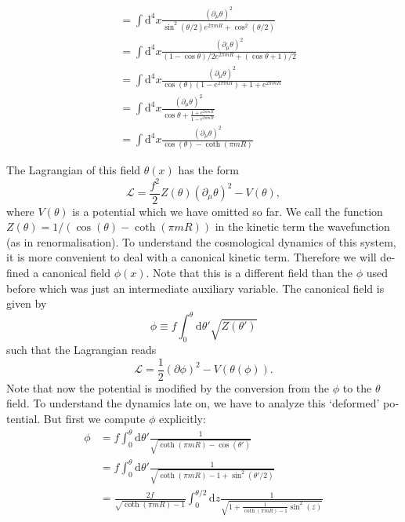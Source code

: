 \documentclass[master,       %
               twoside,        %
               BCOR10mm,       %
               english,ngerman, %
               ]{GAUBM}
\begin{document}
\begin{otherlanguage}{english}
\begin{align}
	 &= \int \mathrm{d}^4 x \frac{(\partial_\mu \theta)^2}{\sin^2(\theta / 2) e^{2\pi m R} + \cos^2(\theta / 2)} \nonumber \\
	 &= \int \mathrm{d}^4 x \frac{(\partial_\mu \theta)^2}{(1 - \cos \theta) / 2 e^{2\pi m R} + (\cos \theta + 1) / 2} \nonumber \\
	 &= \int \mathrm{d}^4 x \frac{(\partial_\mu \theta)^2}{\cos(\theta)(1 - e^{2\pi mR}) + 1 + e^{2\pi mR}} \nonumber \\
	 &= \int \mathrm{d}^4 x \frac{(\partial_\mu \theta)^2}{\cos \theta + \frac{1 + e^{2\pi mR}}{1 - e^{2\pi mR}}} \nonumber \\
	 &= \int \mathrm{d}^4 x \frac{(\partial_\mu \theta)^2}{\cos(\theta) - \coth(\pi mR)}
\end{align}

The Lagrangian of this field $\theta(x)$ has the form
\begin{equation}
	\mathcal{L} = \frac{f^2}{2} Z(\theta) (\partial_\mu \theta)^2 - V(\theta),
\end{equation}
where $V(\theta)$ is a potential which we have omitted so far.
We call the function $Z(\theta) = 1 / (\cos(\theta) - \coth(\pi m R))$ in the kinetic term the wavefunction (as in renormalisation).
To understand the cosmological dynamics of this system, it is more convenient to deal with a canonical kinetic term. Therefore we will defined a canonical field $\phi(x)$. Note that this is a different field than the $\phi$ used before which was just an intermediate auxiliary variable.
The canonical field is given by
\begin{equation}
	\phi \equiv f \int_0^\theta \mathrm{d} \theta' \sqrt{Z(\theta')}
\end{equation}
such that the Lagrangian reads
\begin{equation}
	\mathcal{L} = \frac{1}{2} (\partial \phi)^2 - V(\theta(\phi)).
\end{equation}
Note that now the potential is modified by the conversion from the $\phi$ to the $\theta$ field. To understand the dynamics late on, we have to analyze this `deformed' potential.
But first we compute $\phi$ explicitly:
\begin{align}
	\phi &= f \int_0^\theta \mathrm{d} \theta' \frac{1}{\sqrt{\coth(\pi mR) - \cos(\theta')}} \nonumber \\
	&= f \int_0^\theta \mathrm{d} \theta' \frac{1}{\sqrt{\coth(\pi mR) - 1 + \sin^2(\theta'/2)}} \nonumber \\
	&= \frac{2 f}{\sqrt{\coth(\pi mR) - 1}} \int_0^{\theta/2} \mathrm{d} z \frac{1}{\sqrt{1 + \frac{1}{\coth(\pi mR) - 1} \sin^2(z)}} \nonumber \\

\end{align}
\end{otherlanguage}
\end{document}
